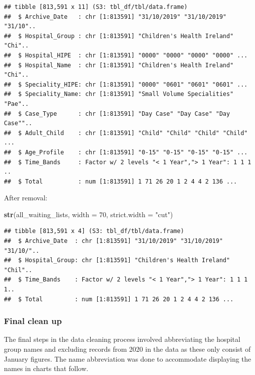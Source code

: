 \documentclass[
  12pt,
]{article}
\newenvironment{Shaded}{\begin{snugshade}}{\end{snugshade}}
\newcommand{\DataTypeTok}[1]{\textcolor[rgb]{0.13,0.29,0.53}{#1}}
\newcommand{\DecValTok}[1]{\textcolor[rgb]{0.00,0.00,0.81}{#1}}
\newcommand{\KeywordTok}[1]{\textcolor[rgb]{0.13,0.29,0.53}{\textbf{#1}}}
\newcommand{\NormalTok}[1]{#1}
\newcommand{\StringTok}[1]{\textcolor[rgb]{0.31,0.60,0.02}{#1}}
\begin{document}
\begin{verbatim}
## tibble [813,591 x 11] (S3: tbl_df/tbl/data.frame)
##  $ Archive_Date   : chr [1:813591] "31/10/2019" "31/10/2019" "31/10"..
##  $ Hospital_Group : chr [1:813591] "Children's Health Ireland" "Chi"..
##  $ Hospital_HIPE  : chr [1:813591] "0000" "0000" "0000" "0000" ...
##  $ Hospital_Name  : chr [1:813591] "Children's Health Ireland" "Chi"..
##  $ Speciality_HIPE: chr [1:813591] "0000" "0601" "0601" "0601" ...
##  $ Speciality_Name: chr [1:813591] "Small Volume Specialities" "Pae"..
##  $ Case_Type      : chr [1:813591] "Day Case" "Day Case" "Day Case""..
##  $ Adult_Child    : chr [1:813591] "Child" "Child" "Child" "Child" ...
##  $ Age_Profile    : chr [1:813591] "0-15" "0-15" "0-15" "0-15" ...
##  $ Time_Bands     : Factor w/ 2 levels "< 1 Year","> 1 Year": 1 1 1 ..
##  $ Total          : num [1:813591] 1 71 26 20 1 2 4 4 2 136 ...
\end{verbatim}

\normalsize

After removal:
\small

\begin{Shaded}
\begin{Highlighting}[]
\KeywordTok{str}\NormalTok{(all\_waiting\_lists, }\DataTypeTok{width =} \DecValTok{70}\NormalTok{, }\DataTypeTok{strict.width =} \StringTok{"cut"}\NormalTok{)}
\end{Highlighting}
\end{Shaded}

\begin{verbatim}
## tibble [813,591 x 4] (S3: tbl_df/tbl/data.frame)
##  $ Archive_Date  : chr [1:813591] "31/10/2019" "31/10/2019" "31/10/"..
##  $ Hospital_Group: chr [1:813591] "Children's Health Ireland" "Chil"..
##  $ Time_Bands    : Factor w/ 2 levels "< 1 Year","> 1 Year": 1 1 1 1..
##  $ Total         : num [1:813591] 1 71 26 20 1 2 4 4 2 136 ...
\end{verbatim}

\normalsize

\hypertarget{final-clean-up}{%
\subsubsection{Final clean up}\label{final-clean-up}}

The final steps in the data cleaning process involved abbreviating the hospital group names and excluding records from 2020 in the data as these only consist of January figures. The name abbreviation was done to accommodate displaying the names in charts that follow.
\end{document}
